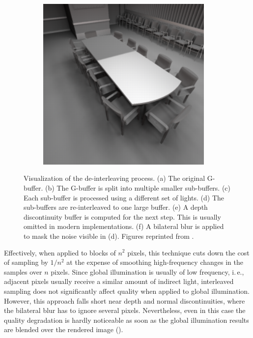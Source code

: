 \begin{figure}[htb]
\begin{subfigure}[b]{0.33\textwidth}
                     \caption{}
                     \label{fig:concept:interleaved_segovia_5}
                     \end{subfigure}%
                     \begin{subfigure}[b]{0.33\textwidth}
                         \centering
                         \includegraphics[width=0.95\textwidth]{graphics/interleaved_segovia_6}
                         \caption{}
                         \label{fig:concept:interleaved_segovia_6}
                     \end{subfigure}
                     \caption{Visualization of the de-interleaving process. (a) The original G-buffer. (b) The G-buffer is split into multiple smaller sub-buffers. (c) Each sub-buffer is processed using a different set of lights. (d) The sub-buffers are re-interleaved to one large buffer. (e) A depth discontinuity buffer is computed for the next step. This is usually omitted in modern implementations. (f) A bilateral blur is applied to mask the noise visible in (d). Figures reprinted from \citet{segovia2006non}.}
                     \label{fig:concept:interleaved_segovia}
                 \end{figure}


                 Effectively, when applied to blocks of $n^2$ pixels, this technique cuts down the cost of sampling by $ 1 / n^2 $ at the expense of smoothing high-frequency changes in the samples over $n$ pixels. Since global illumination is usually of low frequency, i.\,e., adjacent pixels usually receive a similar amount of indirect light, interleaved sampling does not significantly affect quality when applied to global illumination. However, this approach falls short near depth and normal discontinuities, where the bilateral blur has to ignore several pixels. Nevertheless, even in this case the quality degradation is hardly noticeable as soon as the global illumination results are blended over the rendered image ().

